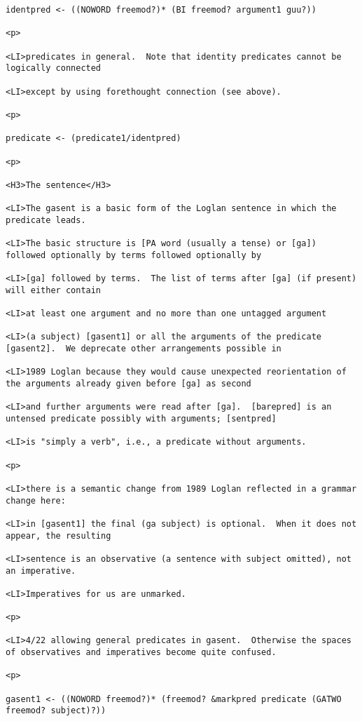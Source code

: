 \documentclass[12pt]{article}
\begin{document}
\begin{lstlisting}
identpred <- ((NOWORD freemod?)* (BI freemod? argument1 guu?))

<p>

<LI>predicates in general.  Note that identity predicates cannot be logically connected

<LI>except by using forethought connection (see above).

<p>

predicate <- (predicate1/identpred)

<p>

<H3>The sentence</H3>

<LI>The gasent is a basic form of the Loglan sentence in which the predicate leads.

<LI>The basic structure is [PA word (usually a tense) or [ga]) followed optionally by terms followed optionally by

<LI>[ga] followed by terms.  The list of terms after [ga] (if present) will either contain

<LI>at least one argument and no more than one untagged argument

<LI>(a subject) [gasent1] or all the arguments of the predicate [gasent2].  We deprecate other arrangements possible in

<LI>1989 Loglan because they would cause unexpected reorientation of the arguments already given before [ga] as second

<LI>and further arguments were read after [ga].  [barepred] is an untensed predicate possibly with arguments; [sentpred]

<LI>is "simply a verb", i.e., a predicate without arguments.

<p>

<LI>there is a semantic change from 1989 Loglan reflected in a grammar change here:

<LI>in [gasent1] the final (ga subject) is optional.  When it does not appear, the resulting

<LI>sentence is an observative (a sentence with subject omitted), not an imperative.

<LI>Imperatives for us are unmarked.

<p>

<LI>4/22 allowing general predicates in gasent.  Otherwise the spaces of observatives and imperatives become quite confused.

<p>

gasent1 <- ((NOWORD freemod?)* (freemod? &markpred predicate (GATWO freemod? subject)?))


\end{lstlisting}
\end{document}
